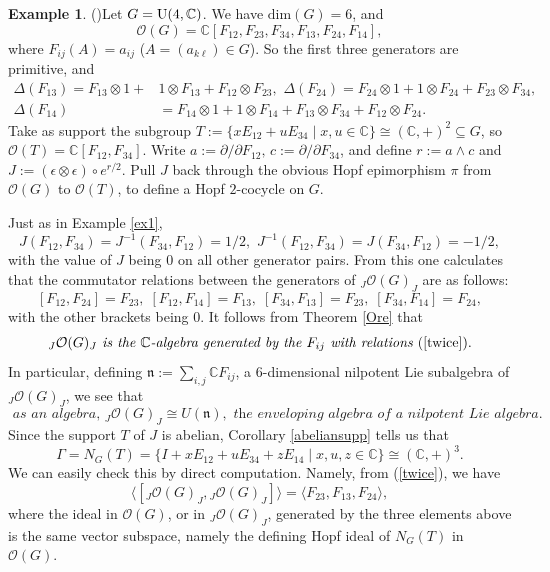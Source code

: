 \documentclass{amsart}
\numberwithin{equation}{section}
\theoremstyle{definition}
\newtheorem{example}[theorem]{Example}
\begin{document}
\begin{example}(\cite[Example 6.4]{G2})\label{ex5}  
Let $G={\rm U}(4,\mathbb{C})$. 
We have $\mathrm{dim}(G) = 6$, and 
$$\mathcal{O}(G) = \mathbb{C}[F_{12},F_{23},F_{34}, F_{13}, F_{24}, F_{14}],$$ where $F_{ij}(A) = a_{ij}$ ($A = (a_{k\ell}) \in G$). So the first three generators are primitive, and
\begin{align*} \Delta (F_{13}) = F_{13} \otimes 1 + &1 \otimes F_{13} + F_{12} \otimes F_{23},\,\,\Delta(F_{24}) =  F_{24} \otimes 1 + 1 \otimes F_{24} + F_{23} \otimes F_{34},\\
\Delta(F_{14}) &= F_{14} \otimes 1 + 1 \otimes F_{14} + F_{13} \otimes F_{34} + F_{12} \otimes F_{24}.
\end{align*}
Take as support the subgroup $T:=\{ xE_{12} + uE_{34} \mid x,u \in \mathbb{C} \}  \cong (\mathbb{C},+)^2 \subseteq G$, so $\mathcal{O}(T) = \mathbb{C}[F_{12}, F_{34}]$. Write $a := \partial/\partial F_{12}, \, c := \partial/\partial F_{34}$, and define $r:= a \wedge c$ and $J:=(\epsilon \otimes \epsilon)\circ e^{r/2}$. Pull $J$ back through the obvious Hopf epimorphism $\pi$ from $\mathcal{O}(G)$ to $\mathcal{O}(T)$, to define a Hopf $2$-cocycle on $G$. 
\medskip

 Just as in Example \ref{ex1}, 
$$ J(F_{12},F_{34})= J^{-1}(F_{34},F_{12})=1/2,\, \,J^{-1}(F_{12},F_{34}) =J(F_{34},F_{12})=-1/2,$$
with the value of $J$ being $0$ on all other generator pairs. From this one calculates that the commutator relations between the generators of ${}_J\mathcal{O}(G)_J$ are as follows:
\begin{equation}\label{twice}
[F_{12},F_{24}] = F_{23}, \; [F_{12},F_{14}] = F_{13},\;[F_{34},F_{13}] = F_{23},\; [F_{34},F_{14}] = F_{24},
\end{equation}
with the other brackets being $0$. It follows from Theorem \ref{Ore} that
$$ {}_J\mathcal{O}(G)_J \textit{ is the } \mathbb{C}\textit{-algebra generated by the }F_{ij} \textit{ with relations } (\ref{twice}).$$
In particular, defining $\mathfrak{n} := \sum_{i,j}\mathbb{C}F_{ij}$, a $6$-dimensional nilpotent Lie subalgebra of ${}_J\mathcal{O}(G)_J$, we see that
$$ \textit{ as an algebra, }{}_J\mathcal{O}(G)_J \cong U(\mathfrak{n}), \textit{ the enveloping algebra of a nilpotent Lie algebra.}$$
\medskip
{} Since the support $T$ of $J$ is abelian, Corollary \ref{abeliansupp} tells us that
\begin{equation}\label{normal} \Gamma = N_G(T) = \{I + xE_{12} + uE_{34} + zE_{14} \mid x,u,z \in \mathbb{C}\} \cong (\mathbb{C},+)^3. 
\end{equation}
We can easily check this by direct computation. Namely, from (\ref{twice}), we have  
$$ \langle [{}_J\mathcal{O}(G)_J,{}_J\mathcal{O}(G)_J]\rangle = \langle F_{23}, F_{13}, F_{24} \rangle,$$ 
where the ideal in $\mathcal{O}(G)$, or in ${}_J\mathcal{O}(G)_J$, generated by the three elements above is the same vector subspace, namely the defining Hopf ideal of $N_G(T)$ in $\mathcal{O}(G)$.
\medskip


\end{example}
\end{document}
